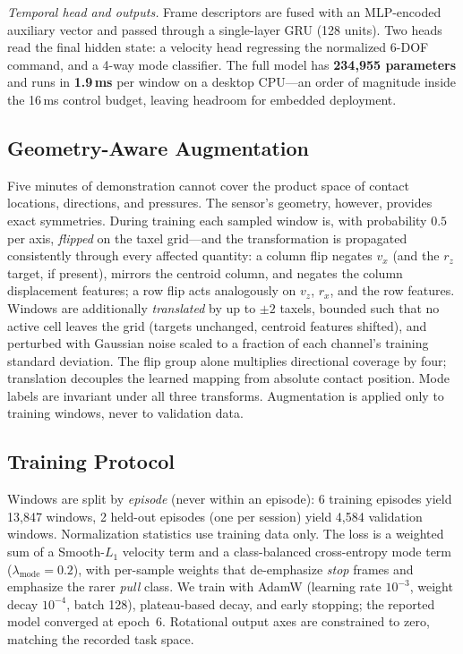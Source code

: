 \documentclass[runningheads]{llncs}
\begin{document}
\emph{Temporal head and outputs.}  Frame descriptors are fused with an
MLP-encoded auxiliary vector and passed through a single-layer GRU (128
units).  Two heads read the final hidden state: a velocity head regressing
the normalized 6-DOF command, and a 4-way mode classifier.  The full model
has \textbf{234{,}955 parameters} and runs in \textbf{1.9\,ms} per window
on a desktop CPU---an order of magnitude inside the 16\,ms control budget,
leaving headroom for embedded deployment.

\subsection{Geometry-Aware Augmentation}
\label{sec:augment}

Five minutes of demonstration cannot cover the product space of contact
locations, directions, and pressures.  The sensor's geometry, however,
provides exact symmetries.  During training each sampled window is, with
probability $0.5$ per axis, \emph{flipped} on the taxel grid---and the
transformation is propagated consistently through every affected quantity:
a column flip negates $v_x$ (and the $r_z$ target, if present), mirrors
the centroid column, and negates the column displacement features; a row
flip acts analogously on $v_z$, $r_x$, and the row features.  Windows are
additionally \emph{translated} by up to $\pm2$ taxels, bounded such that
no active cell leaves the grid (targets unchanged, centroid features
shifted), and perturbed with Gaussian noise scaled to a fraction of each
channel's training standard deviation.  The flip group alone multiplies
directional coverage by four; translation decouples the learned mapping
from absolute contact position.  Mode labels are invariant under all three
transforms.  Augmentation is applied only to training windows, never to
validation data.

\subsection{Training Protocol}

Windows are split by \emph{episode} (never within an episode): 6 training
episodes yield 13{,}847 windows, 2 held-out episodes (one per session)
yield 4{,}584 validation windows.  Normalization statistics use training
data only.  The loss is a weighted sum of a Smooth-$L_1$ velocity term and
a class-balanced cross-entropy mode term ($\lambda_{\text{mode}}=0.2$),
with per-sample weights that de-emphasize \emph{stop} frames and emphasize
the rarer \emph{pull} class.  We train with AdamW (learning rate $10^{-3}$,
weight decay $10^{-4}$, batch 128), plateau-based decay, and early
stopping; the reported model converged at epoch~6.  Rotational output
axes are constrained to zero, matching the recorded task space.
\end{document}
